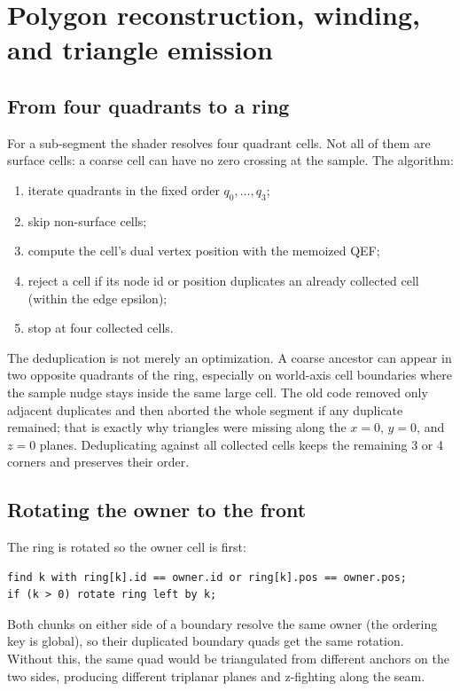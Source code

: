 \section{Polygon reconstruction, winding, and triangle emission}
\label{sec:polygon}

\subsection{From four quadrants to a ring}

For a sub-segment the shader resolves four quadrant cells.  Not all of
them are surface cells: a coarse cell can have no zero crossing at the
sample.  The algorithm:
\begin{enumerate}
\item iterate quadrants in the fixed order $q_0,\ldots,q_3$;
\item skip non-surface cells;
\item compute the cell's dual vertex position with the memoized QEF;
\item reject a cell if its node id or position duplicates an already
  collected cell (within the edge epsilon);
\item stop at four collected cells.
\end{enumerate}
The deduplication is not merely an optimization.  A coarse ancestor can
appear in two opposite quadrants of the ring, especially on world-axis
cell boundaries where the sample nudge stays inside the same large cell.
The old code removed only adjacent duplicates and then aborted the whole
segment if any duplicate remained; that is exactly why triangles were
missing along the $x=0$, $y=0$, and $z=0$ planes.  Deduplicating against
all collected cells keeps the remaining 3 or 4 corners and preserves their
order.

\subsection{Rotating the owner to the front}

The ring is rotated so the owner cell is first:
\begin{lstlisting}[style=glsl,caption={Owner rotation.},label={lst:rotate}]
find k with ring[k].id == owner.id or ring[k].pos == owner.pos;
if (k > 0) rotate ring left by k;
\end{lstlisting}
Both chunks on either side of a boundary resolve the same owner (the
ordering key is global), so their duplicated boundary quads get the same
rotation.  Without this, the same quad would be triangulated from different
anchors on the two sides, producing different triplanar planes and
z-fighting along the seam.

